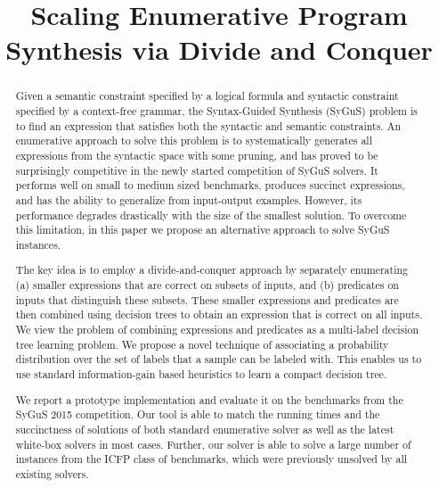 \documentclass{llncs}
\begin{document}
\title{Scaling Enumerative Program Synthesis via Divide and Conquer}
\author{}
\institute{}
\maketitle
\vspace*{-6ex}

\begin{abstract}
  Given a semantic constraint specified by a logical formula and
  syntactic constraint specified by a context-free grammar, the
  Syntax-Guided Synthesis (SyGuS) problem is to find an expression
  that satisfies both the syntactic and semantic constraints.
  An enumerative approach to solve this problem is to systematically
  generates all expressions from the syntactic space with some pruning,
  and has proved to be surprisingly competitive in the newly started
  competition of SyGuS solvers.  It performs well on small to medium sized
  benchmarks, produces succinct expressions, and has the ability to
  generalize from input-output examples.  However, its performance
  degrades drastically with the size of the smallest solution. To overcome
  this limitation, in this paper we propose an alternative approach to
  solve SyGuS instances.

  The key idea  is to employ a divide-and-conquer approach by
  separately enumerating (a) smaller expressions that are correct on
  subsets of inputs, and (b) predicates on inputs that distinguish these
  subsets.  These smaller expressions and predicates are then combined
  using decision trees to obtain an expression that is correct on all
  inputs.  We view the problem of combining expressions and predicates as
  a multi-label decision tree learning problem. We propose a novel
  technique of associating a probability distribution over the set of
  labels that a sample can be labeled with. This enables us to use
  standard information-gain based heuristics to learn a compact decision
  tree.

  We report a prototype implementation and evaluate it on the benchmarks
  from the SyGuS 2015 competition. Our tool is able to match the running
  times and the succinctness of solutions of both standard enumerative
  solver as well as the latest white-box solvers in most cases.  Further,
  our solver is able to solve a large number of instances from the ICFP
  class of benchmarks, which were previously unsolved by all existing
  solvers.
\end{abstract}
\end{document}
